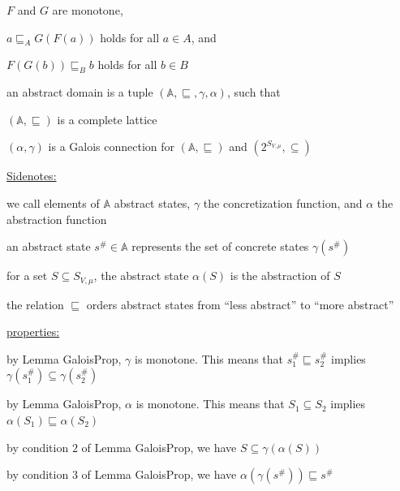\documentclass[landscape, a4paper]{article}
\begin{document}
\begin{minipage}[t]{0.2\linewidth}
\begin{betterlist}
\begin{betterlist}
			\item $F$ and $G$ are \alert{monotone},
			\item $a \sqsubseteq_A G(F(a))$ holds for all $a \in A$, and
			\item $F(G(b)) \sqsubseteq_B b$ holds for all $b \in B$
			\item {}
		\end{betterlist}\color{black}
		\item \color{orange}an \alert{abstract domain} is a tuple $(\mathbb{A}, \sqsubseteq, \gamma, \alpha)$, such that
		\begin{betterlist}
			\item $(\mathbb{A}, \sqsubseteq)$ is a complete lattice
			\item $(\alpha, \gamma)$ is a Galois connection for $(\mathbb{A}, \sqsubseteq)$ and $(2^{S_{V ,\mu}}, \subseteq)$
			\item \underline{Sidenotes:}
			\begin{betterlist}
				\item we call elements of $\mathbb{A}$ \alert{abstract states}, $\gamma$ the \alert{concretization function}, and $\alpha$ the \alert{abstraction function}
				\item an abstract state $s^\# \in \mathbb{A}$ represents the set of concrete states $\gamma(s^\#)$
				\item for a set $S \subseteq S_{V,\mu}$, the abstract state $\alpha(S)$ is the abstraction of $S$
				\item the relation $\sqsubseteq$ orders abstract states from \enquote{less abstract} to \enquote{more abstract}
				\item \underline{properties:}
				\begin{betterlist}
					\item by Lemma GaloisProp, $\gamma$ is monotone. This means that $s^\#_1 \sqsubseteq s^\#_2$ implies $\gamma(s^\#_1) \subseteq \gamma(s^\#_2)$
					\item by Lemma GaloisProp, $\alpha$ is monotone. This means that $S_1 \subseteq S_2$ implies $\alpha(S_1) \sqsubseteq \alpha(S_2)$
					\item by condition $2$ of Lemma GaloisProp, we have $S \subseteq \gamma(\alpha(S))$
					\item by condition $3$ of Lemma GaloisProp, we have $\alpha(\gamma(s^\#)) \sqsubseteq s^\#$
				\end{betterlist}
			\end{betterlist}
			\item {}

\end{betterlist}
\end{betterlist}
\end{minipage}
\end{document}
